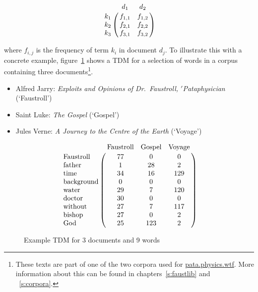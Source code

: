 \begin{equation}
  \bbordermatrix{~ & d_1 & d_2 \cr
        k_1 & f_{1,1} & f_{1,2} \cr
        k_2 & f_{2,1} & f_{2,2} \cr
        k_3 & f_{3,1} & f_{3,2}}
\label{eq:tdm}
\end{equation}

where $f_{i,j}$ is the frequency of term $k_{i}$ in document $d_{j}$. To illustrate this with a concrete example, figure~\ref{fig:termdocs} shows a \ac{TDM} for a selection of words in a corpus containing three documents\footnote{These texts are part of one of the two corpora used for \url{pata.physics.wtf}. More information about this can be found in chapters~\ref{s:faustlib} and ~\ref{s:corpora}.}.

\begin{itemize}
  \item Alfred Jarry: \textit{Exploits and Opinions of Dr.\ Faustroll, $'$Pataphysician} (`Faustroll') \autocite*{Jarry1996}
  \item Saint Luke: \textit{The Gospel} (`Gospel') \autocite*{Luke2005}
  \item Jules Verne: \textit{A Journey to the Centre of the Earth} (`Voyage') \autocite*{Verne2010}
\end{itemize}

\begin{figure}[!htbp]
\[
  \bbordermatrix{
    ~                  & \text{Faustroll} & \text{Gospel} & \text{Voyage} \cr
    \text{Faustroll}   & 77               & 0             & 0             \cr
    \text{father}      & 1                & 28            & 2             \cr
    \text{time}        & 34               & 16            & 129           \cr
    \text{background}  & 0                & 0             & 0             \cr
    \text{water}       & 29               & 7             & 120           \cr
    \text{doctor}      & 30               & 0             & 0             \cr
    \text{without}     & 27               & 7             & 117           \cr
    \text{bishop}      & 27               & 0             & 2             \cr
    \text{God}         & 25               & 123           & 2
  }
\]
\caption[Example TDM]{Example TDM for 3 documents and 9 words}
\label{fig:termdocs}
\end{figure}


